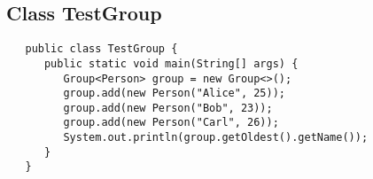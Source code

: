 \documentclass[12pt,a4paper,oneside,ngerman]{article}
\begin{document}
\subsection{Class TestGroup}
\begin{lstlisting}
   public class TestGroup {
      public static void main(String[] args) {
         Group<Person> group = new Group<>();
         group.add(new Person("Alice", 25));
         group.add(new Person("Bob", 23));
         group.add(new Person("Carl", 26));
         System.out.println(group.getOldest().getName());
      }
   }
\end{lstlisting}
\end{document}
